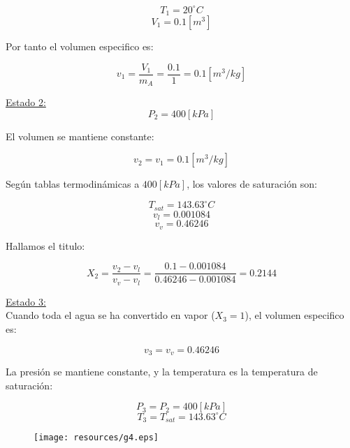 \documentclass[letter,11pt]{article}
\begin{document}
\begin{enumerate}
\begin{equation*}
    T_1=20^\circ C
\end{equation*}
\begin{equation*}
    V_1=0.1[m^3]
\end{equation*}

Por tanto el volumen especifico es:

\begin{equation*}
    v_1=\frac{V_1}{m_A}=\frac{0.1}{1}=0.1[m^3/kg]
\end{equation*}

\underline{Estado 2:} \\

\begin{equation*}
    P_2=400[kPa]
\end{equation*}

El volumen se mantiene constante:

\begin{equation*}
    v_2=v_1=0.1[m^3/kg]
\end{equation*}

Según tablas termodinámicas a $400[kPa]$, los valores de saturación son:

\begin{equation*}
    T_{sat}=143.63^\circ C
\end{equation*}
\begin{equation*}
    v_l=0.001084
\end{equation*}
\begin{equation*}
    v_v=0.46246
\end{equation*}

Hallamos el titulo:

\begin{equation*}
    X_2=\frac{v_2-v_l}{v_v-v_l}=\frac{0.1-0.001084}{0.46246-0.001084}=0.2144
\end{equation*}

\underline{Estado 3:} \\

Cuando toda el agua se ha convertido en vapor ($X_3=1$), el volumen especifico es:

\begin{equation*}
    v_3=v_v=0.46246
\end{equation*}

La presión se mantiene constante, y la temperatura es la temperatura de saturación:

\begin{equation*}
    P_3=P_2=400[kPa]
\end{equation*}
\begin{equation*}
    T_3=T_{sat}=143.63^\circ C
\end{equation*}

\begin{figure}[!h]
\centering
\texttt{[image: resources/g4.eps]}
\end{figure}
\vspace{1.0cm}

\end{enumerate}
\end{document}
